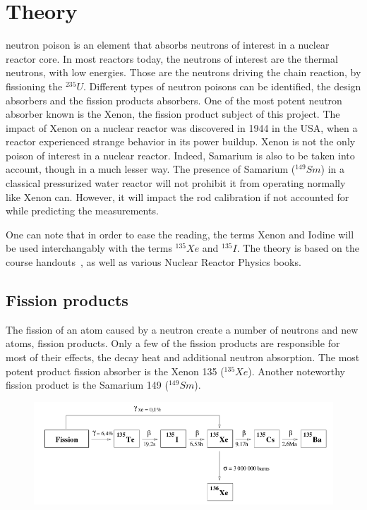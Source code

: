 %
%
\let\textcircled=\pgftextcircled
\chapter{Theory}
\label{chap:intro}

 neutron poison is an element that absorbs neutrons of interest in a nuclear reactor core. In most reactors today, the neutrons of interest are the thermal neutrons, with low energies. Those are the neutrons driving the chain reaction, by fissioning the $^{235}U$. Different types of neutron poisons can be identified, the design absorbers and the fission products absorbers. One of the most potent neutron absorber known is the Xenon, the fission product subject of this project. The impact of Xenon on a nuclear reactor was discovered in 1944 in the USA, when a reactor experienced strange behavior in its power buildup. Xenon is not the only poison of interest in a nuclear reactor. Indeed, Samarium is also to be taken into account, though in a much lesser way. The presence of Samarium ($^{149}Sm$) in a classical pressurized water reactor will not prohibit it from operating normally like Xenon can. However, it will impact the rod calibration if not accounted for while predicting the measurements.

One can note that in order to ease the reading, the terms Xenon and Iodine will be used interchangably with the terms $^{135}Xe$ and $^{135}I$. The theory is based on the course handouts~\cite{reactor01}, as well as various Nuclear Reactor Physics books.



\section{Fission products}

The fission of an atom caused by a neutron create a number of neutrons and new atoms, fission products. Only a few of the fission products are responsible for most of their effects, the decay heat and additional neutron absorption. The most potent product fission absorber is the Xenon 135 ($^{135}Xe$). Another noteworthy fission product is the Samarium 149 ($^{149}Sm$).

\begin{figure}[t!]
	\centering
	\includegraphics[height=0.4\textheight]{fig01/xenon_chain.png}
	\label{fig:chain}
\end{figure}


